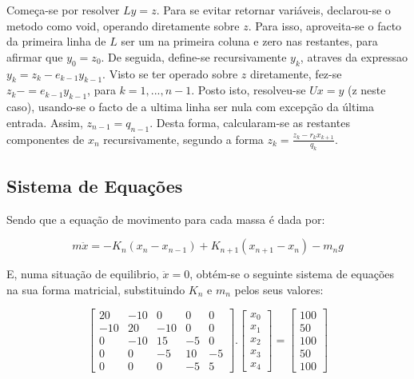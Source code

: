 \documentclass{article}
\begin{document}
\begin{multicols}{2}
  Começa-se por resolver $Ly = z$. Para se evitar retornar variáveis, declarou-se o metodo como void, operando diretamente sobre $z$. Para isso, aproveita-se o facto da primeira linha de $L$ ser um na primeira coluna e zero nas restantes, para afirmar que $y_0 = z_0$. De seguida, define-se recursivamente $y_k$, atraves da expressao $y_k = z_k - e_{k-1}y_{k-1}$. Visto se ter operado sobre $z$ diretamente, fez-se $z_k -= e_{k-1}y_{k-1}$, para $k = 1, ..., n-1$. Posto isto, resolveu-se $Ux = y$ (z neste caso), usando-se o facto de a ultima linha ser nula com excepção da última entrada. Assim, $z_{n-1} = q_{n-1}$. Desta forma, calcularam-se as restantes componentes de $x_n$ recursivamente, segundo a forma $z_k = \frac{z_k - r_kx_{k+1}}{q_k}$.

  \subsection{Sistema de Equações}

  Sendo que a equação de movimento para cada massa é dada por: 

  \begin{equation}
    m\ddot{x} = -K_n(x_n - x_{n-1}) + K_{n+1}(x_{n+1} - x_n) - m_ng
  \end{equation}

  E, numa situação de equilibrio, $\ddot{x} = 0$, obtém-se o seguinte sistema de equações na sua forma matricial, substituindo $K_n$ e $m_n$ pelos seus valores:

  \[
  \begin{bmatrix}
    20  & -10 &  0  &  0 &  0\\ 
    -10 & 20  & -10 &  0 &  0\\ 
    0   & -10 &  15 & -5 &  0\\ 
    0   &  0  & -5  & 10 & -5\\ 
    0   &  0  &  0  & -5 &  5
  \end{bmatrix}
  .
  \begin{bmatrix}
    x_{0}\\
    x_{1}\\
    x_{2}\\
    x_{3}\\
    x_{4} 
  \end{bmatrix}
  =
  \begin{bmatrix}
    100\\
    50 \\
    100\\
    50 \\
    100 
  \end{bmatrix}
  \]


\end{multicols}
\end{document}
